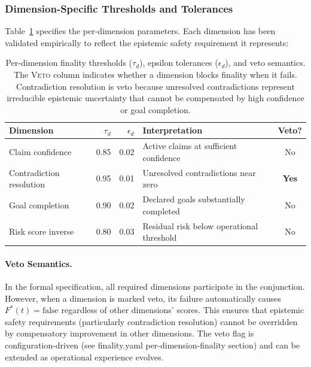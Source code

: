\documentclass[11pt]{article}
\begin{document}
\subsubsection{Dimension-Specific Thresholds and Tolerances}

Table~\ref{tab:vector-finality-thresholds} specifies the per-dimension parameters. Each dimension
has been validated empirically to reflect the epistemic safety requirement it represents:

\begin{table}[H]
\centering
\small
\begin{tabular}{lrrl|c}
\toprule
\textbf{Dimension} & $\tau_d$ & $\epsilon_d$ & \textbf{Interpretation} & \textbf{Veto?} \\
\midrule
Claim confidence & 0.85 & 0.02 & Active claims at sufficient confidence & No \\
Contradiction resolution & 0.95 & 0.01 & Unresolved contradictions near zero & \textbf{Yes} \\
Goal completion & 0.90 & 0.02 & Declared goals substantially completed & No \\
Risk score inverse & 0.80 & 0.03 & Residual risk below operational threshold & No \\
\bottomrule
\end{tabular}
\caption{Per-dimension finality thresholds ($\tau_d$), epsilon tolerances ($\epsilon_d$), and veto semantics.
The \textnormal{\textsc{Veto}} column indicates whether a dimension blocks finality when it fails.
Contradiction resolution is veto because unresolved contradictions represent irreducible epistemic uncertainty
that cannot be compensated by high confidence or goal completion.}
\label{tab:vector-finality-thresholds}
\end{table}

\paragraph{Veto Semantics.}
In the formal specification, all required dimensions participate in the conjunction. However, when
a dimension is marked veto, its failure automatically causes $F^*(t) = \text{false}$ regardless of other
dimensions' scores. This ensures that epistemic safety requirements (particularly contradiction resolution)
cannot be overridden by compensatory improvement in other dimensions. The veto flag is configuration-driven
(see finality.yaml per-dimension-finality section) and can be extended as operational experience evolves.
\end{document}
